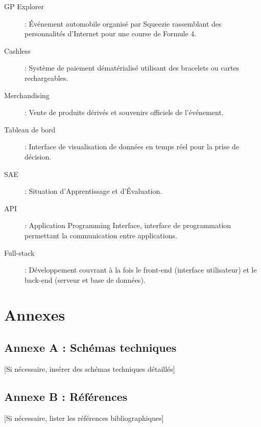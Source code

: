 \documentclass[12pt,a4paper]{article}
\begin{document}
\begin{description}
    \item[GP Explorer] : Événement automobile organisé par Squeezie rassemblant des personnalités d'Internet pour une course de Formule 4.
    \item[Cashless] : Système de paiement dématérialisé utilisant des bracelets ou cartes rechargeables.
    \item[Merchandising] : Vente de produits dérivés et souvenirs officiels de l'événement.
    \item[Tableau de bord] : Interface de visualisation de données en temps réel pour la prise de décision.
    \item[SAE] : Situation d'Apprentissage et d'Évaluation.
    \item[API] : Application Programming Interface, interface de programmation permettant la communication entre applications.
    \item[Full-stack] : Développement couvrant à la fois le front-end (interface utilisateur) et le back-end (serveur et base de données).
\end{description}

\newpage
\section*{Annexes}

\subsection*{Annexe A : Schémas techniques}
[Si nécessaire, insérer des schémas techniques détaillés]

\subsection*{Annexe B : Références}
[Si nécessaire, lister les références bibliographiques]

\newpage
\thispagestyle{empty}
\vspace*{\fill}
\end{document}

